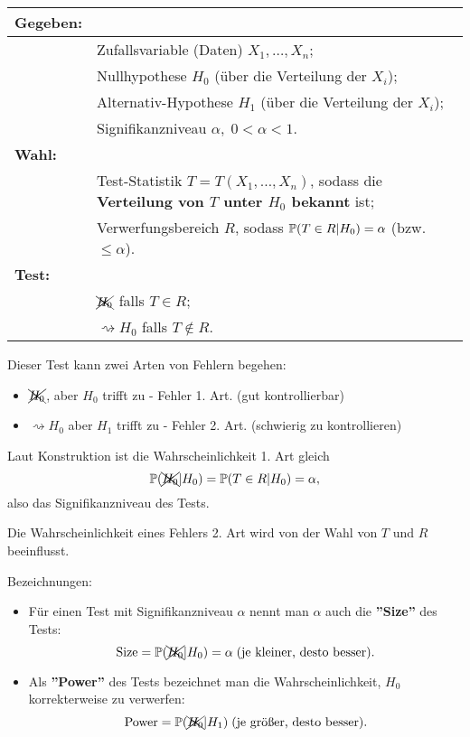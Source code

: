 \documentclass{tstextbook}
\begin{document}
\begin{tabular}{ll}
	\textbf{Gegeben:}	& 	\\
	\midrule
				& Zufallsvariable (Daten) $ X_1,\ldots, X_n $; \\
				& Nullhypothese $ H_0 $ (über die Verteilung der $ X_i $); \\
				& Alternativ-Hypothese $ H_1 $ (über die Verteilung der $ X_i $); \\
				& Signifikanzniveau $ \alpha, \; 0<\alpha<1. $ \\
	
	\textbf{Wahl: }		& \\
	\midrule
				& Test-Statistik $ T = T(X_1,\ldots,X_n) $, sodass die \textbf{Verteilung von $ T $ unter $ H_0 $ bekannt} ist; \\
				& Verwerfungsbereich $ R $, sodass $ \mathbb P(T\in R|H_0) = \alpha $ (bzw. $ \le \alpha $). \\
	
	\textbf{Test: }		& \\
	\midrule
				&  $ \xcancel{H_0} $ falls $ T\in R $; \\
				& $ \rightsquigarrow H_0 $ falls $ T\notin R $.
\end{tabular}
\vspace{0.5cm}

Dieser Test kann zwei Arten von Fehlern begehen:
\begin{itemize}
	\item $ \xcancel{H_0} $, aber $ H_0 $ trifft zu - Fehler 1. Art. (gut kontrollierbar)
	\item $ \rightsquigarrow H_0 $ aber $ H_1 $ trifft zu - Fehler 2. Art. (schwierig zu kontrollieren)
\end{itemize}

Laut Konstruktion ist die Wahrscheinlichkeit 1. Art gleich 
	\[
	\mathbb P(\xcancel{H_0}|H_0) = \mathbb P(T\in R|H_0) = \alpha,
	\]
also das Signifikanzniveau des Tests.

Die Wahrscheinlichkeit eines Fehlers 2. Art wird von der Wahl von $ T $ und $ R $ beeinflusst. 

\begin{remark}
	Bezeichnungen: 
	\begin{itemize}
		\item Für einen Test mit Signifikanzniveau $ \alpha $ nennt man $ \alpha $ auch die \textbf{''Size''} des Tests:
		\[
		\text{Size} = \mathbb P(\xcancel{H_0}|H_0)=\alpha \; (\text{je kleiner, desto besser}).
		\]
		\item Als \textbf{''Power''} des Tests bezeichnet man die Wahrscheinlichkeit, $ H_0 $ korrekterweise zu verwerfen:
		\[
		\text{Power} = \mathbb P(\xcancel{H_0}|H_1) \; (\text{je größer, desto besser}).
		\]
	\end{itemize}
\end{remark}
\end{document}
